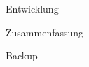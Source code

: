 \documentclass[aspectratio=1610, professionalfonts, 9pt]{beamer}
\begin{document}
\begin{frame}{Entwicklung}

\end{frame}



\begin{frame}{Zusammenfassung}

\end{frame}


\begin{frame}{Backup}

\end{frame}
%
\end{document}
